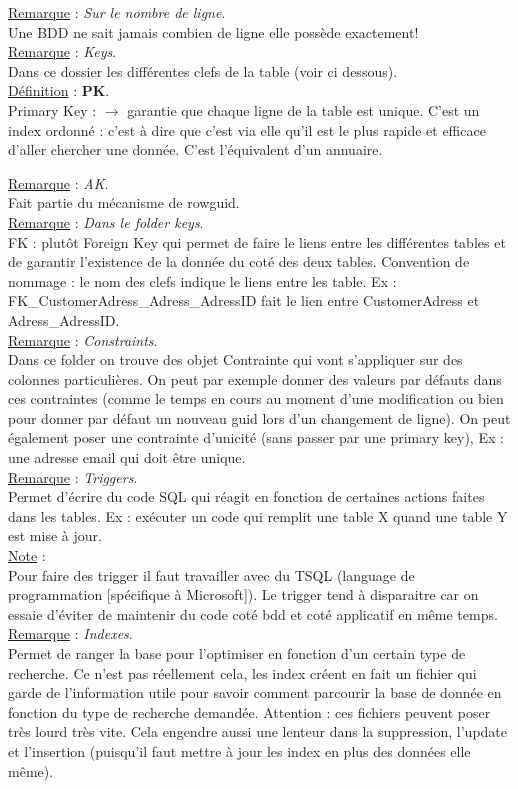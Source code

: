 \documentclass[a4paper,12pt,twoside]{article}
\newcommand{\rem}[2]{\noindent\underline{Remarque} : \textit{#1}.\\ \indent #2}
\newcommand{\note}[1]{\noindent\underline{Note} : \\ \indent #1}
\newcommand{\defi}[2]{\noindent\underline{Définition} : \textbf{#1}.\\ \indent #2}
\begin{document}
\rem{Sur le nombre de ligne}{Une BDD ne sait jamais combien de ligne elle possède exactement!}\\

\rem{Keys}{Dans ce dossier les différentes clefs de la table (voir ci dessous).}\\

\defi{PK}{Primary Key : $\to$ garantie que chaque ligne de la table est unique. C'est un index ordonné : c'est à dire que c'est via elle qu'il est le plus rapide et efficace d'aller chercher une donnée. C'est l'équivalent d'un annuaire.}

\rem{AK}{Fait partie du mécanisme de rowguid.}\\

\rem{Dans le folder keys}{FK : plutôt Foreign Key qui permet de faire le liens entre les différentes tables et de garantir l'existence de la donnée du coté des deux tables. Convention de nommage : le nom des clefs indique le liens entre les table. Ex : FK\_CustomerAdress\_Adress\_AdressID fait le lien entre CustomerAdress et Adress\_AdressID.}\\

\rem{Constraints}{Dans ce folder on trouve des objet Contrainte qui vont s'appliquer sur des colonnes particulières. On peut par exemple donner des valeurs par défauts dans ces contraintes (comme le temps en cours au moment d'une modification ou bien pour donner par défaut un nouveau guid lors d'un changement de ligne). On peut également poser une contrainte d'unicité (sans passer par une primary key), Ex : une adresse email qui doit être unique.}\\

\rem{Triggers}{Permet d'écrire du code SQL qui réagit en fonction de certaines actions faites dans les tables. Ex : exécuter un code qui remplit une table X quand une table Y est mise à jour.}\\

\note{Pour faire des trigger il faut travailler avec du TSQL (language de programmation [spécifique à Microsoft]). Le trigger tend à disparaitre car on essaie d'éviter de maintenir du code coté bdd et coté applicatif en même temps.}\\

\rem{Indexes}{Permet de ranger la base pour l'optimiser en fonction d'un certain type de recherche. Ce n'est pas réellement cela, les index créent en fait un fichier qui garde de l'information utile pour savoir comment parcourir la base de donnée en fonction du type de recherche demandée. Attention : ces fichiers peuvent poser très lourd très vite. Cela engendre aussi une lenteur dans la suppression, l'update et l'insertion (puisqu'il faut mettre à jour les index en plus des données elle même).}\\
\end{document}
